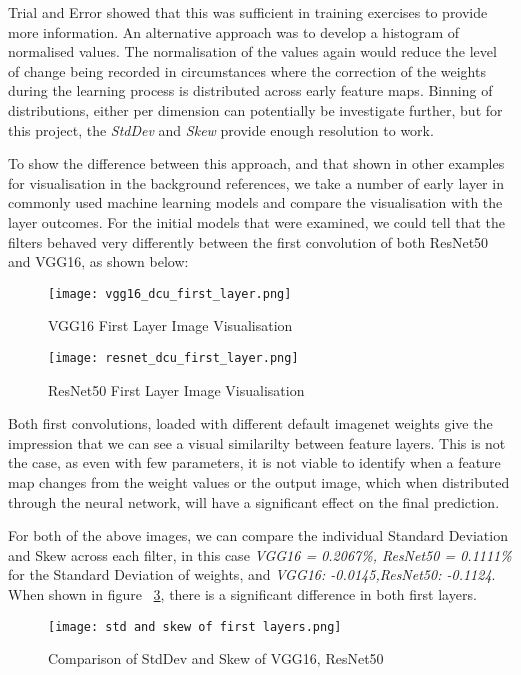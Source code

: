Trial and Error showed that this was sufficient in training exercises to provide more information. An alternative approach was to develop a histogram of normalised values. The normalisation of the values again would reduce the level of change being recorded in circumstances where the correction of the weights during the learning process is distributed across early feature maps. Binning of distributions, either per dimension can potentially be investigate further, but for this project, the \textit{StdDev} and \textit{Skew} provide enough resolution to work.

To show the difference between this approach, and that shown in other examples for visualisation in the background references, we take a number of early layer in commonly used machine learning models and compare the visualisation with the layer outcomes. For the initial models that were examined, we could tell that the filters behaved very differently between the first convolution of both ResNet50 and VGG16, as shown below:

\begin{figure}[!ht]
    \centering
    \texttt{[image: vgg16\_dcu\_first\_layer.png]}
    \caption{VGG16 First Layer Image Visualisation}
    \label{fig:vgg16_dcu_image}
\end{figure}

\begin{figure}[!ht]
    \centering
    \texttt{[image: resnet\_dcu\_first\_layer.png]}
    \caption{ResNet50 First Layer Image Visualisation}
    \label{fig:resnet50_dcu_image}
\end{figure}

Both first convolutions, loaded with different default imagenet weights give the impression that we can see a visual similarilty between feature layers. This is not the case, as even with few parameters, it is not viable to identify when a feature map changes from the weight values or the output image, which when distributed through the neural network, will have a significant effect on the final prediction.

For both of the above images, we can compare the individual Standard Deviation and Skew across each filter, in this case \textit{VGG16 = 0.2067\%, ResNet50 = 0.1111\%} for the Standard Deviation of weights, and \textit{VGG16: -0.0145,ResNet50: -0.1124}. When shown in figure ~\ref{fig:firstlayermodelcomparison}, there is a significant difference in both first layers.

\begin{figure}[!ht]
    \centering
    \texttt{[image: std and skew of first layers.png]}
    \caption{Comparison of StdDev and Skew of VGG16, ResNet50}
    \label{fig:firstlayermodelcomparison}
\end{figure}


